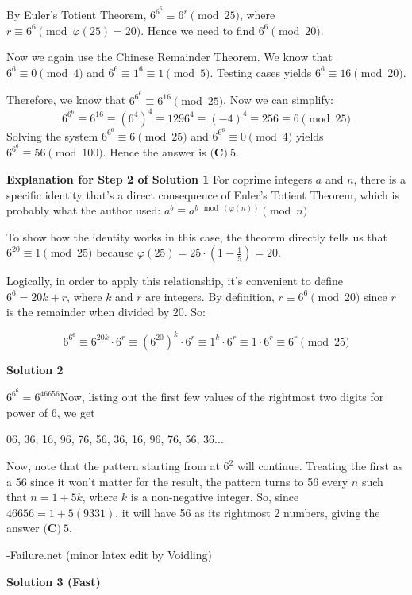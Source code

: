 \begin{enumerate}
 By Euler’s Totient Theorem, $6^{6^6}\equiv 6^r\pmod{25}$, where $r\equiv 6^6\pmod{\varphi(25)=20}$. Hence we need to find $6^6\pmod{20}$.

 Now we again use the Chinese Remainder Theorem. We know that $6^6\equiv 0\pmod{4}$ and $6^6\equiv 1^6\equiv 1\pmod{5}$. Testing cases yields $6^6\equiv 16\pmod{20}$.

 Therefore, we know that $6^{6^6}\equiv 6^{16}\pmod{25}$. Now we can simplify:
 \[6^{6^6}\equiv 6^{16}\equiv (6^4)^4\equiv 1296^4\equiv (-4)^4\equiv 256\equiv 6\pmod{25}\]Solving the system $6^{6^6}\equiv 6\pmod{25}$ and $6^{6^6}\equiv 0\pmod{4}$ yields $6^{6^6}\equiv 56\pmod{100}$. Hence the answer is $\boxed{\textbf{(C)}~5}$.

 \textbf{Explanation for Step 2 of Solution 1} For coprime integers $a$ and $n$, there is a specific identity that's a direct consequence of Euler's Totient Theorem, which is probably what the author used: $a^{b}\equiv a^{b \mod(\varphi(n))}\pmod{n}$

 To show how the identity works in this case, the theorem directly tells us that $6^{20}\equiv 1\pmod{25}$ because $\varphi(25)=25\cdot(1-\frac{1}{5})=20$.

 Logically, in order to apply this relationship, it's convenient to define $6^6=20k+r$, where $k$ and $r$ are integers. By definition, $r\equiv 6^6\pmod{20}$ since $r$ is the remainder when divided by $20$. So:

 
 \[6^{6^6}\equiv 6^{20k}\cdot6^r\equiv (6^{20})^k\cdot6^r\equiv 1^k\cdot6^r\equiv 1\cdot6^r\equiv 6^r\pmod{25}\]




\textbf{Solution 2}

$6^{6^6} = 6^{46656}$Now, listing out the first few values of the rightmost two digits for power of 6, we get

 06, 36, 16, 96, 76, 56, 36, 16, 96, 76, 56, 36...

 Now, note that the pattern starting from at $6^2$ will continue. Treating the first as a 56 since it won't matter for the result, the pattern turns to 56 every $n$ such that $n=1+5k$, where $k$ is a non-negative integer. So, since $46656 = 1 + 5(9331)$, it will have 56 as its rightmost 2 numbers, giving the answer $\boxed{\textbf{(C)}~5}$.

 -Failure.net (minor latex edit by Voidling)

 



\textbf{Solution 3 (Fast)}


\end{enumerate}
